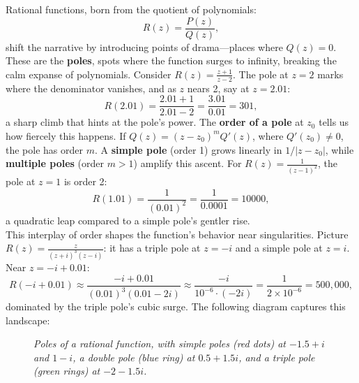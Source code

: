 \noindent Rational functions, born from the quotient of polynomials:
\[
R(z) = \frac{P(z)}{Q(z)},
\]
shift the narrative by introducing points of drama—places where $Q(z) = 0$. These are the \textbf{poles}, spots where the function surges to infinity, breaking the calm expanse of polynomials. Consider $R(z) = \frac{z + 1}{z - 2}$. The pole at $z = 2$ marks where the denominator vanishes, and as $z$ nears 2, say at $z = 2.01$:
\[
R(2.01) = \frac{2.01 + 1}{2.01 - 2} = \frac{3.01}{0.01} = 301,
\]
a sharp climb that hints at the pole’s power. The \textbf{order of a pole} at $z_0$ tells us how fiercely this happens. If $Q(z) = (z - z_0)^m Q'(z)$, where $Q'(z_0) \neq 0$, the pole has order $m$. A \textbf{simple pole} (order 1) grows linearly in $1/|z - z_0|$, while \textbf{multiple poles} (order $m > 1$) amplify this ascent. For $R(z) = \frac{1}{(z - 1)^2}$, the pole at $z = 1$ is order 2:
\[
R(1.01) = \frac{1}{(0.01)^2} = \frac{1}{0.0001} = 10000,
\]
a quadratic leap compared to a simple pole’s gentler rise. \\

\noindent This interplay of order shapes the function’s behavior near singularities. Picture $R(z) = \frac{z}{(z + i)^3 (z - i)}$: it has a triple pole at $z = -i$ and a simple pole at $z = i$. Near $z = -i + 0.01$:
\[
R(-i + 0.01) \approx \frac{-i + 0.01}{(0.01)^3 (0.01 - 2i)} \approx \frac{-i}{10^{-6} \cdot (-2i)} = \frac{1}{2 \times 10^{-6}} = 500{,}000,
\]
\noindent dominated by the triple pole’s cubic surge. The following diagram captures this landscape:

\begin{figure}[H]
  \centering
{}
\caption{\textit{Poles of a rational function, with simple poles (red dots) at $-1.5 + i$ and $1 - i$, a double pole (blue ring) at $0.5 + 1.5i$, and a triple pole (green rings) at $-2 - 1.5i$.}}
\label{fig:pole-orders}

\end{figure}

